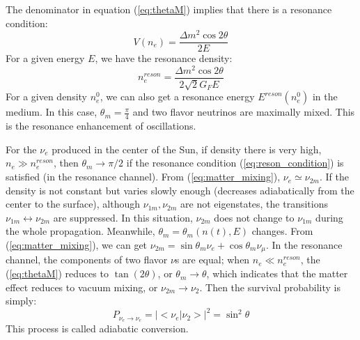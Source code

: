 \documentclass[preprint,12pt]{elsarticle}
\numberwithin{equation}{section}
\begin{document}
The denominator in equation (\ref{eq:thetaM}) implies that there is a resonance condition:
\begin{equation}\label{eq:reson_condition}
V(n_e)=\frac{\Delta m^2\cos2\theta}{2E}
\end{equation}
For a given energy $E$, we have the resonance density:
\begin{equation}
n^{reson}_{e}=\frac{\Delta m^2\cos2\theta}{2\sqrt2G_FE}
\end{equation}
For a given density $n^0_e$, we can also get a resonance energy $E^{reson}(n^0_e)$ in the medium.
In this case, $\theta_m = \frac{\pi}{4}$ and two flavor neutrinos are maximally mixed. This is the resonance enhancement of oscillations\cite{smirnov,japan_text}.

For the $\nu_e$ produced in the center of the Sun, if density there is very high, $n_e\gg n^{reson}_e$, then $\theta_m\to\pi/2$ if the resonance condition (\ref{eq:reson_condition}) is satisfied (in the resonance channel). From (\ref{eq:matter_mixing}), $\nu_e\simeq\nu_{2m}$.
If the density is not constant but varies slowly enough (decreases adiabatically from the center to the surface), although $\nu_{1m},\nu_{2m}$ are not eigenstates, the transitions $\nu_{1m}\leftrightarrow \nu_{2m}$ are suppressed. In this situation, $\nu_{2m}$ does not change to $\nu_{1m}$ during the whole propagation. Meanwhile, $\theta_m=\theta_m(n(t),E)$ changes. From (\ref{eq:matter_mixing}), we can get $\nu_{2m} = \sin\theta_m\nu_e+\cos\theta_m\nu_\mu$. In the resonance channel, the components of two flavor $\nu$s are equal; when $n_e\ll n^{reson}_e$, the (\ref{eq:thetaM}) reduces to $\tan(2\theta)$, or $\theta_m\to\theta$, which indicates that the matter effect reduces to vacuum mixing, or $\nu_{2m}\to\nu_2$. Then the survival probability is simply: 
\begin{equation}\label{eq:adiabatic}
P_{\nu_e\to\nu_e}=|<\nu_e|\nu_2>|^2=\sin^2\theta
\end{equation}
This process is called adiabatic conversion\cite{smirnov}. 
\end{document}
